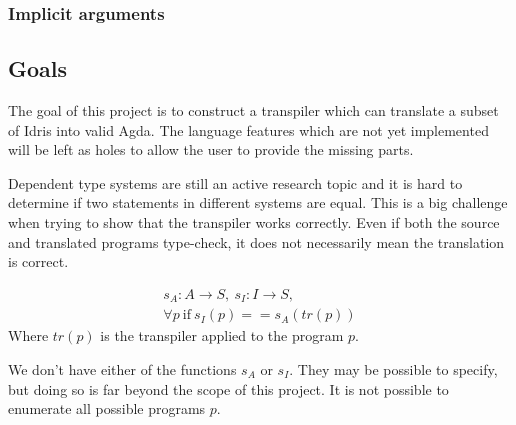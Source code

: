 \documentclass[parskip=half]{scrartcl}
\begin{document}
\subsubsection{Implicit arguments}


\subsection{Goals}
The goal of this project is to construct a transpiler which can
translate a subset of Idris into valid Agda. The language features which are
not yet implemented will be left as holes to allow the user to provide the
missing parts.



Dependent type systems are still an active research topic and it is hard
to determine if two statements in different systems are equal. This is
a big challenge when trying to show that the transpiler works correctly.
Even if both the source and translated programs type-check, it does not
necessarily mean the translation is correct.


\begin{align}
  s_A : A \rightarrow S,
  \ s_I : I \rightarrow S, \\
  \forall p\ \text{if}\  s_I(p) == s_A (tr(p))
\end{align}
Where $tr(p)$ is the transpiler applied to the program $p$.

We don't have either of the functions $s_A$ or $s_I$. They may be possible to
specify, but doing so is far beyond the scope of this project.
It is not possible to enumerate all possible programs $p$.
\end{document}
